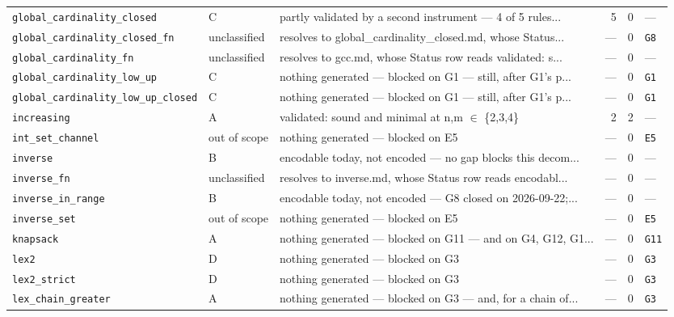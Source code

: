 \documentclass[10pt,a4paper]{article}
\begin{document}
\begin{longtable}{@{}>{\raggedright\arraybackslash}p{}l>{\raggedright\arraybackslash}p{}rrl@{}}
\texttt{global\_\allowbreak{}cardinality\_\allowbreak{}closed} & C & partly validated by a second instrument --- 4 of 5 rules... & 5 & 0 & --- \\
\texttt{global\_\allowbreak{}cardinality\_\allowbreak{}closed\_\allowbreak{}fn} & unclassified & resolves to global\_cardinality\_closed.md, whose Status... & --- & 0 & \texttt{G8} \\
\texttt{global\_\allowbreak{}cardinality\_\allowbreak{}fn} & unclassified & resolves to gcc.md, whose Status row reads validated: s... & --- & 0 & --- \\
\texttt{global\_\allowbreak{}cardinality\_\allowbreak{}low\_\allowbreak{}up} & C & nothing generated --- blocked on G1 --- still, after G1's p... & --- & 0 & \texttt{G1} \\
\texttt{global\_\allowbreak{}cardinality\_\allowbreak{}low\_\allowbreak{}up\_\allowbreak{}closed} & C & nothing generated --- blocked on G1 --- still, after G1's p... & --- & 0 & \texttt{G1} \\
\texttt{increasing} & A & validated: sound and minimal at n,m $\in$ \{2,3,4\} & 2 & 2 & --- \\
\texttt{int\_\allowbreak{}set\_\allowbreak{}channel} & out of scope & nothing generated --- blocked on E5 & --- & 0 & \texttt{E5} \\
\texttt{inverse} & B & encodable today, not encoded --- no gap blocks this decom... & --- & 0 & --- \\
\texttt{inverse\_\allowbreak{}fn} & unclassified & resolves to inverse.md, whose Status row reads encodabl... & --- & 0 & --- \\
\texttt{inverse\_\allowbreak{}in\_\allowbreak{}range} & B & encodable today, not encoded --- G8 closed on 2026-09-22;... & --- & 0 & --- \\
\texttt{inverse\_\allowbreak{}set} & out of scope & nothing generated --- blocked on E5 & --- & 0 & \texttt{E5} \\
\texttt{knapsack} & A & nothing generated --- blocked on G11 --- and on G4, G12, G1... & --- & 0 & \texttt{G11} \\
\texttt{lex2} & D & nothing generated --- blocked on G3 & --- & 0 & \texttt{G3} \\
\texttt{lex2\_\allowbreak{}strict} & D & nothing generated --- blocked on G3 & --- & 0 & \texttt{G3} \\
\texttt{lex\_\allowbreak{}chain\_\allowbreak{}greater} & A & nothing generated --- blocked on G3 --- and, for a chain of... & --- & 0 & \texttt{G3} \\

\end{longtable}
\end{document}
